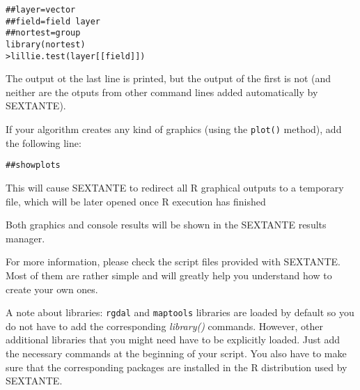 \begin{verbatim}
##layer=vector
##field=field layer
##nortest=group
library(nortest)
>lillie.test(layer[[field]]) 	
\end{verbatim}

The output ot the last line is printed, but the output of the first is not (and neither are the otputs from other command lines added automatically by SEXTANTE).

If your algorithm creates any kind of graphics (using the \texttt{plot()} method), add the following line:

\begin{verbatim}
##showplots
\end{verbatim}

This will cause SEXTANTE to redirect all R graphical outputs to a temporary file, which will be later opened once R execution has finished

Both graphics and console results will be shown in the SEXTANTE results manager.

For more information, please check the script files provided with SEXTANTE. Most of them are rather simple and will greatly help you understand how to create your own ones.

A note about libraries: \texttt{rgdal} and \texttt{maptools} libraries are loaded by default so you do not have to add the corresponding \emph{library()} commands. However, other additional libraries that you might need have to be explicitly loaded. Just add the necessary commands at the beginning of your script. You also have to make sure that the corresponding packages are installed in the R distribution used by SEXTANTE.











